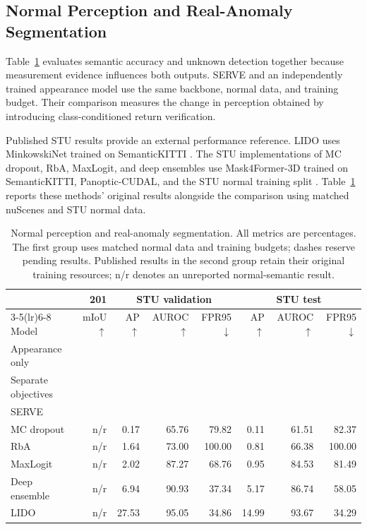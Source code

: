 \documentclass{article}
\newcommand{\blank}{\textcolor{gray}{\textemdash}}
\begin{document}
\subsection{Normal Perception and Real-Anomaly Segmentation}
\label{sec:benchmark}
Table~\ref{tab:main} evaluates semantic accuracy and unknown detection together because measurement evidence influences both outputs. SERVE and an independently trained appearance model use the same backbone, normal data, and training budget. Their comparison measures the change in perception obtained by introducing class-conditioned return verification.

Published STU results provide an external performance reference. LIDO uses MinkowskiNet trained on SemanticKITTI \citep{lido}. The STU implementations of MC dropout, RbA, MaxLogit, and deep ensembles use Mask4Former-3D trained on SemanticKITTI, Panoptic-CUDAL, and the STU normal training split \citep{stu}. Table~\ref{tab:main} reports these methods' original results alongside the comparison using matched nuScenes and STU normal data.

\begin{table}[htbp]
\caption{Normal perception and real-anomaly segmentation. All metrics are percentages. The first group uses matched normal data and training budgets; dashes reserve pending results. Published results in the second group retain their original training resources; n/r denotes an unreported normal-semantic result.}
\label{tab:main}
\centering\small\setlength{\tabcolsep}{3.5pt}
\begin{tabular}{lrrrrrrr}
\toprule
 & 201 & \multicolumn{3}{c}{STU validation} & \multicolumn{3}{c}{STU test}\\
\cmidrule(lr){3-5}\cmidrule(lr){6-8}
Model & mIoU$\uparrow$ & AP$\uparrow$ & AUROC$\uparrow$ & FPR95$\downarrow$ & AP$\uparrow$ & AUROC$\uparrow$ & FPR95$\downarrow$\\
\midrule
Appearance only & \blank & \blank & \blank & \blank & \blank & \blank & \blank\\
Separate objectives & \blank & \blank & \blank & \blank & \blank & \blank & \blank\\
SERVE & \blank & \blank & \blank & \blank & \blank & \blank & \blank\\
\midrule
MC dropout \citep{stu} & n/r & 0.17 & 65.76 & 79.82 & 0.11 & 61.51 & 82.37\\
RbA \citep{stu} & n/r & 1.64 & 73.00 & 100.00 & 0.81 & 66.38 & 100.00\\
MaxLogit \citep{stu} & n/r & 2.02 & 87.27 & 68.76 & 0.95 & 84.53 & 81.49\\
Deep ensemble \citep{stu} & n/r & 6.94 & 90.93 & 37.34 & 5.17 & 86.74 & 58.05\\
LIDO \citep{lido} & n/r & 27.53 & 95.05 & 34.86 & 14.99 & 93.67 & 34.29\\
\bottomrule
\end{tabular}
\end{table}
\end{document}
